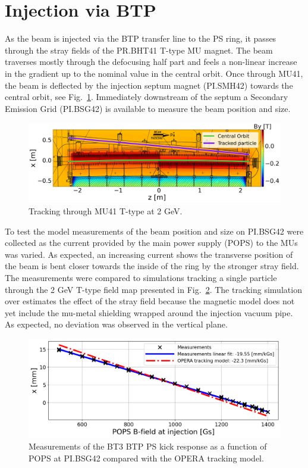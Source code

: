 \documentclass[a4paper,
               biblatex,     %
               keeplastbox,   %
               ]{jacow}
\begin{document}
\section{Injection via BTP}
As the beam is injected via the BTP transfer line to the PS ring, it passes through the stray fields of the PR.BHT41 T-type MU magnet. The beam traverses mostly through the defocusing half part and feels a non-linear increase in the gradient up to the nominal value in the central orbit. Once through MU41, the beam is deflected by the injection septum magnet (PI.SMH42) towards the central orbit, see Fig.~\ref{fig:injection_btp}. Immediately downstream of the septum a Secondary Emission Grid (PI.BSG42) is available to measure the beam position and size.

\begin{figure}[!htb]
   \centering
   \includegraphics*[width=1.0\columnwidth]{MOPOTK030_f5.png}
   \caption{Tracking through MU41 T-type at 2 GeV.}
   \label{fig:injection_btp}
\end{figure}

To test the model measurements of the beam position and size on PI.BSG42 were collected as the current provided by the main power supply (POPS) to the MUs was varied. As expected, an increasing current shows the transverse position of the beam is bent closer towards the inside of the ring by the stronger stray field. The measurements were compared to simulations tracking a single particle through the 2 GeV T-type field map presented in Fig.~\ref{fig:injection_btp_transverse_position}. The tracking simulation over estimates the effect of the stray field because the magnetic model does not yet include the mu-metal shielding wrapped around the injection vacuum pipe. As expected, no deviation was observed in the vertical plane.

\begin{figure}[!htb]
   \centering
   \includegraphics*[width=1.0\columnwidth]{transverse_position_vs_POPS.png}
   \caption{Measurements of the BT3 BTP PS kick response as a function of POPS at PI.BSG42 compared with the OPERA tracking model.}
   \label{fig:injection_btp_transverse_position}
\end{figure}
\end{document}
